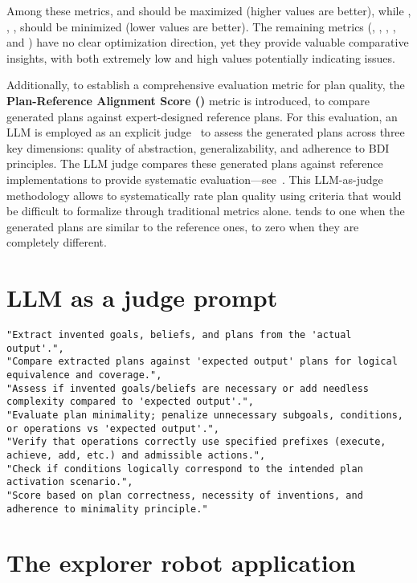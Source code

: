 \documentclass[12pt,a4paper,openright,twoside]{book}
\begin{document}
Among these metrics, \GR{} and \TSR{} should be maximized (higher values are better), while \RR{}, \GSA{}, \BSA{}, \GAT{} should be minimized (lower values are better).
%
The remaining metrics (\PC{}, \CC{}, \PBC{}, \NGC{}, and \NBC{}) have no clear optimization direction, yet they provide valuable comparative insights, with both extremely low and high values potentially indicating issues.

Additionally, to establish a comprehensive evaluation metric for plan quality, the \textbf{Plan-Reference Alignment Score (\PRAS{})} metric is introduced, to compare generated plans against expert-designed reference plans.
%
For this evaluation, an \ac{LLM} is employed as an explicit judge~\cite{DBLP:journals/corr/abs-2412-05579} to assess the generated plans across three key dimensions: quality of abstraction, generalizability, and adherence to BDI principles. 
%
The \ac{LLM} judge compares these generated plans against reference implementations to provide systematic evaluation---see~.
%
This \ac{LLM}-as-judge methodology allows  to systematically rate plan quality using criteria that would be difficult to formalize through traditional metrics alone.
%
\PRAS{} tends to one when the generated plans are similar to the reference ones, to zero when they are completely different.

\section{LLM as a judge prompt}\label{app:llm-judge}
\begin{lstlisting}[basicstyle=\footnotesize\ttfamily,breaklines=true]
"Extract invented goals, beliefs, and plans from the 'actual output'.",
"Compare extracted plans against 'expected output' plans for logical equivalence and coverage.",
"Assess if invented goals/beliefs are necessary or add needless complexity compared to 'expected output'.",
"Evaluate plan minimality; penalize unnecessary subgoals, conditions, or operations vs 'expected output'.",
"Verify that operations correctly use specified prefixes (execute, achieve, add, etc.) and admissible actions.",
"Check if conditions logically correspond to the intended plan activation scenario.",
"Score based on plan correctness, necessity of inventions, and adherence to minimality principle."
\end{lstlisting}

\section{The explorer robot application}
\end{document}
